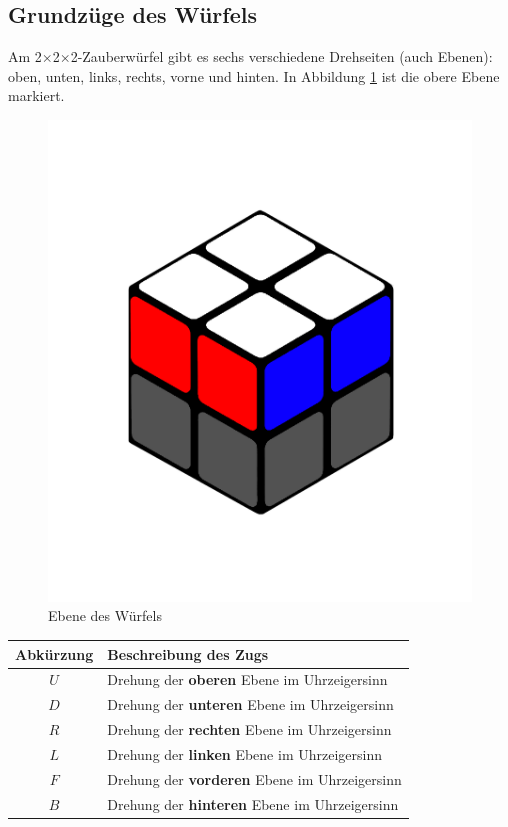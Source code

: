 \documentclass[12pt,a4paper, usenames, dvipsnames]{article}
\newcommand{\Ttwo}{2$\times$2$\times$2-}
\begin{document}
%
%
%
%
%
%
%
%
%
%
%
%
%


\subsection*{Grundzüge des Würfels} 
Am \Ttwo Zauberwürfel gibt es sechs verschiedene Drehseiten (auch Ebenen): oben, unten, links, rechts, vorne und hinten. 
In Abbildung \ref{24} ist die obere Ebene markiert.

\begin{figure}[h]
\centering
\includegraphics[scale=0.1]{ebene.png}
\caption[Ebene des Würfels]{Ebene des Würfels}
\label{24}
\end{figure}

\begin{center}
\begin{tabular}{cl}
\toprule
\textbf{Abkürzung} & \textbf{Beschreibung des Zugs} \\
\midrule
$U$ & Drehung der \textbf{oberen} Ebene im Uhrzeigersinn \\
$D$ & Drehung der \textbf{unteren} Ebene im Uhrzeigersinn \\
$R$ & Drehung der \textbf{rechten} Ebene im Uhrzeigersinn \\
$L$ & Drehung der \textbf{linken} Ebene im Uhrzeigersinn \\
$F$ & Drehung der \textbf{vorderen} Ebene im Uhrzeigersinn \\
$B$ & Drehung der \textbf{hinteren} Ebene im Uhrzeigersinn \\
\bottomrule
\end{tabular} 
\end{center}
\end{document}
